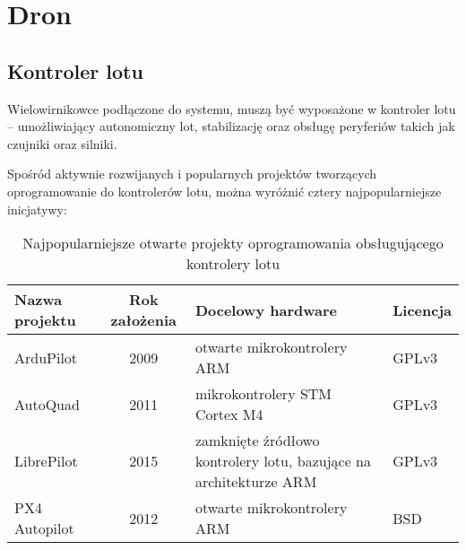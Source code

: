 	

	
	
	 

\section{Dron}

\subsection{Kontroler lotu}

Wielowirnikowce podłączone do systemu, muszą być
wyposażone w kontroler lotu -- umożliwiający
autonomiczny lot, stabilizację oraz obsługę 
peryferiów takich jak czujniki oraz silniki.

Spośród aktywnie rozwijanych i popularnych
projektów \cite{autopilots_sourvey} tworzących oprogramowanie do kontrolerów
lotu, można wyróżnić cztery najpopularniejsze inicjatywy: 

\begin{table}[htb]
	\centering\small
	\caption{
		Najpopularniejsze otwarte projekty
		oprogramowania obsługującego kontrolery lotu
	}
	\label{tab}

	\begin{tabularx}{0.87\textwidth}
	{ 
	| >{\raggedright\arraybackslash}l 
	| c 
	| >{\raggedright\arraybackslash}X
	| >{\raggedleft\arraybackslash}l |
	}
	\hline
	\textbf{Nazwa projektu} & \textbf{Rok założenia} &
	\textbf{Docelowy hardware}
	&  \textbf{Licencja}
	\\\hline
	ArduPilot\cite{ardupilot_home_page}		&  2009	& otwarte mikrokontrolery ARM & GPLv3
	\\ \hline
	AutoQuad\cite{autoquad_timeline}		&  2011	& mikrokontrolery STM Cortex M4		 & GPLv3
	\\ \hline
	LibrePilot\cite{librepilot_home_page}	&  2015	& zamknięte źródłowo kontrolery lotu, bazujące na architekturze ARM & GPLv3
	\\ \hline       
	PX4 Autopilot\cite{px4_home_page}		&  2012	& otwarte mikrokontrolery ARM & BSD
	\\ \hline       
	\end{tabularx}
	
\end{table}

